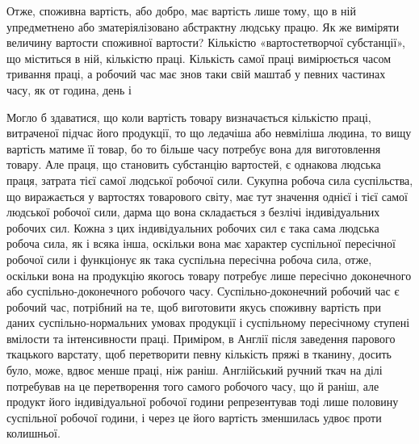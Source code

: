 Отже, споживна вартість, або добро, має вартість лише тому,
що в ній упредметнено або зматеріялізовано абстрактну людську
працю. Як же виміряти величину вартости споживної вартости?
Кількістю «вартостетворчої субстанції», що міститься в ній,
кількістю праці. Кількість самої праці вимірюється часом тривання
праці, а робочий час має знов таки свій маштаб у певних
частинах часу, як от година, день і~

Могло б здаватися, що коли вартість товару визначається
кількістю праці, витраченої підчас його продукції, то що ледачіша
або невміліша людина, то вищу вартість матиме її товар,
бо то більше часу потребує вона для виготовлення товару. Але
праця, що становить субстанцію вартостей, є однакова людська
праця, затрата тієї самої людської робочої сили. Сукупна робоча
сила суспільства, що виражається у вартостях товарового світу,
має тут значення однієї і тієї самої людської робочої сили, дарма
що вона складається з безлічі індивідуальних робочих сил. Кожна
з цих індивідуальних робочих сил є така сама людська робоча
сила, як і всяка інша, оскільки вона має характер суспільної
пересічної робочої сили і функціонує як така суспільна пересічна
робоча сила, отже, оскільки вона на продукцію якогось товару
потребує лише пересічно доконечного або суспільно-доконечного
робочого часу. Суспільно-доконечний робочий час є робочий
час, потрібний на те, щоб виготовити якусь споживну вартість
при даних суспільно-нормальних умовах продукції і суспільному
пересічному ступені вмілости та інтенсивности праці. Приміром,
в Англії після заведення парового ткацького варстату,
щоб перетворити певну кількість пряжі в тканину, досить було,
може, вдвоє менше праці, ніж раніш. Англійський ручний ткач
на ділі потребував на це перетворення того самого робочого часу,
що й раніш, але продукт його індивідуальної робочої години
репрезентував тоді лише половину суспільної робочої години, і
через це його вартість зменшилась удвоє проти колишньої.

